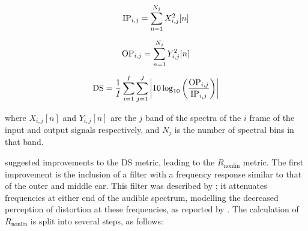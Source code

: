 			\begin{gather}
				\mathrm{IP}_{i,j} = \sum_{n = 1}^{N_{j}} X_{i,j}^{2}[n] \nonumber \\[0.6em]
				\mathrm{OP}_{i,j} = \sum_{n = 1}^{N_{j}} Y_{i,j}^{2}[n] \nonumber \\[0.6em]
				\mathrm{DS} = \frac{1}{I} \sum_{i = 1}^{I} \sum_{j = 1}^{J} 
					\left|10\log_{10} \left( \frac{\mathrm{OP}_{i,j}}{\mathrm{IP}_{i,j}} \right) \right|
				\label{eq:DistortionScore}
			\end{gather}

			where $X_{i,j}[n]$ and $Y_{i,j}[n]$ are the $j$ band of the spectra of the $i$
			frame of the input and output signals respectively, and $N_{j}$ is the number of spectral bins in
			that band.
			
			\citet{tan2004predicting} suggested improvements to the $\mathrm{DS}$ metric, leading to the
			$R_{\mathrm{nonlin}}$ metric. The first improvement is the inclusion of a filter with a frequency
			response similar to that of the outer and middle ear. This filter was described by
			\citet{glasberg2002a}; it attenuates frequencies at either end of the audible spectrum, modelling
			the decreased perception of distortion at these frequencies, as reported by
			\citet{voishvillo2006assessment}. The calculation of $R_{\mathrm{nonlin}}$ is split into several
			steps, as follows:
			
